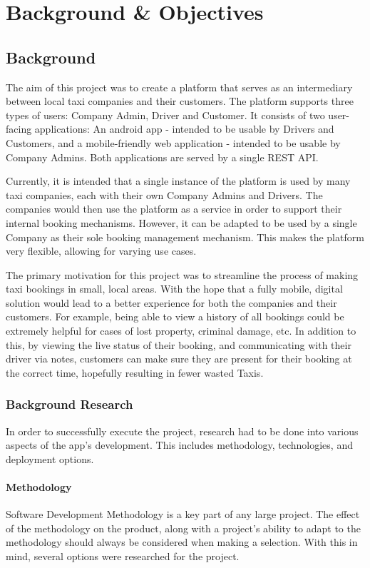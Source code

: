 \chapter{Background \& Objectives}

\section{Background}
The aim of this project was to create a platform that serves as an intermediary between local taxi companies and their customers. The platform supports three types of users: Company Admin, Driver and Customer. It consists of two user-facing applications: An android app - intended to be usable by Drivers and Customers, and a mobile-friendly web application - intended to be usable by Company Admins. Both applications are served by a single REST API.

Currently, it is intended that a single instance of the platform is used by many taxi companies, each with their own Company Admins and Drivers. The companies would then use the platform as a service in order to support their internal booking mechanisms. However, it can be adapted to be used by a single Company as their sole booking management mechanism. This makes the platform very flexible, allowing for varying use cases.

The primary motivation for this project was to streamline the process of making taxi bookings in small, local areas. With the hope that a fully mobile, digital solution would lead to a better experience for both the companies and their customers. For example, being able to view a history of all bookings could be extremely helpful for cases of lost property, criminal damage, etc. In addition to this, by viewing the live status of their booking, and communicating with their driver via notes, customers can make sure they are present for their booking at the correct time, hopefully resulting in fewer wasted Taxis.

\subsection{Background Research}
In order to successfully execute the project, research had to be done into various aspects of the app's development. This includes methodology, technologies, and deployment options.

\subsubsection{Methodology}
Software Development Methodology is a key part of any large project. The effect of the methodology on the product, along with a project's ability to adapt to the methodology should always be considered when making a selection. With this in mind, several options were researched for the project.

